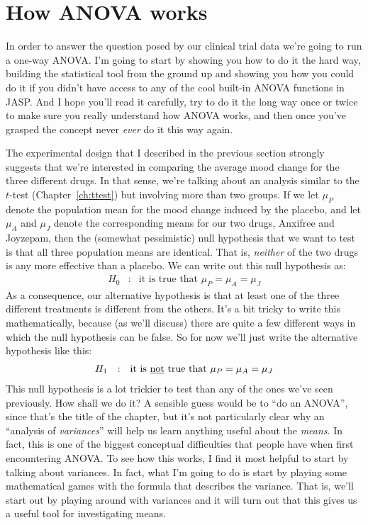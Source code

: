 \section{How ANOVA works \label{sec:anovaintro}}

In order to answer the question posed by our clinical trial data we're going to run a one-way ANOVA. I'm going to start by showing you how to do it the hard way, building the statistical tool from the ground up and showing you how you could do it if you didn't have access to any of the cool built-in ANOVA functions in JASP. And I hope you'll read it carefully, try to do it the long way once or twice to make sure you really understand how ANOVA works, and then once you've grasped the concept never {\it ever} do it this way again.

The experimental design that I described in the previous section strongly suggests that we're interested in comparing the average mood change for the three different drugs. In that sense, we're talking about an analysis similar to the $t$-test (Chapter~\ref{ch:ttest}) but involving more than two groups. If we let $\mu_P$ denote the population mean for the mood change induced by the placebo, and let $\mu_A$ and $\mu_J$ denote the corresponding means for our two drugs, Anxifree and Joyzepam, then the (somewhat pessimistic) null hypothesis that we want to test is that all three population means are identical. That is, {\it neither} of the two drugs is any more effective than a placebo. We can write out this null hypothesis as:
$$
\begin{array}{rcl}
H_0 &:& \mbox{it is true that } \mu_P = \mu_A = \mu_J
\end{array}
$$
As a consequence, our alternative hypothesis is that at least one of the three different treatments is different from the others. It's a bit tricky to write this mathematically, because (as we'll discuss) there are quite a few different ways in which the null hypothesis can be false. So for now we'll just write the alternative hypothesis like this:
$$
\begin{array}{rcl}
H_1 &:& \mbox{it is \underline{not} true that } \mu_P = \mu_A = \mu_J
\end{array}
$$
This null hypothesis is a lot trickier to test than any of the ones we've seen previously. How shall we do it? A sensible guess would be to ``do an ANOVA'', since that's the title of the chapter, but it's not particularly clear why an ``analysis of {\it variances}'' will help us learn anything useful about the {\it means}. In fact, this is one of the biggest conceptual difficulties that people have when first encountering ANOVA. To see how this works, I find it most helpful to start by talking about variances. In fact, what I'm going to do is start by playing some mathematical games with the formula that describes the variance. That is, we'll start out by playing around with variances and it will turn out that this gives us a useful tool for investigating means.

